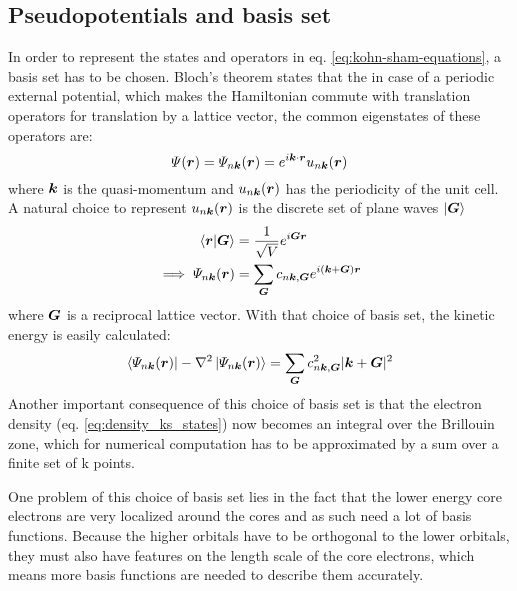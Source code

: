 \documentclass[main.tex]{subfiles}
\begin{document}
\subsection{Pseudopotentials and basis set}\label{sub:theory_basis_set}

In order to represent the states and operators in eq. \ref{eq:kohn-sham-equations}, a basis set has to be chosen.
Bloch's theorem states that the in case of a periodic external potential, which makes the Hamiltonian commute with translation operators for translation by a lattice vector, the common eigenstates of these operators are:
\begin{equation}
    \Psi (\vb*{r}) = \Psi_{n \vb*{k}} (\vb*{r}) = e^{i \vb*{k} \cdot \vb*{r}} u_{n \vb*{k}} (\vb*{r})
\end{equation}
where \(\vb*{k}\) is the quasi-momentum and \(u_{n \vb*{k}} (\vb*{r})\) has the periodicity of the unit cell.
A natural choice to represent \(u_{n \vb*{k}} (\vb*{r})\) is the discrete set of plane waves \(\ket{\vb*{G}}\)
\begin{align}
    \bra{\vb*{r}} \ket{\vb*{G}} &= \frac{1}{\sqrt{V}} e^{i \vb*{G} \vb*{r}} \\
    \implies \Psi_{n \vb*{k}} (\vb*{r}) &= \sum_{\vb*{G}} c_{n \vb*{k}, \vb*{G}} e^{i (\vb*{k} + \vb*{G}) \vb*{r}}
\end{align}
where \(\vb*{G}\) is a reciprocal lattice vector. 
With that choice of basis set, the kinetic energy is easily calculated:
\begin{equation}
    \bra{\Psi_{n \vb*{k}} (\vb*{r})} - \nabla^2 \ket{\Psi_{n \vb*{k}} (\vb*{r})} = \sum_{\vb*{G}} c_{n \vb*{k}, \vb*{G}}^2 \vert \vb*{k} + \vb*{G} \vert^2
\end{equation}
Another important consequence of this choice of basis set is that the electron density (eq. \ref{eq:density_ks_states}) now becomes an integral over the Brillouin zone, which for numerical computation has to be approximated by a sum over a finite set of k points. 

One problem of this choice of basis set lies in the fact that the lower energy core electrons are very localized around the cores and as such need a lot of basis functions.
Because the higher orbitals have to be orthogonal to the lower orbitals, they must also have features on the length scale of the core electrons, which means more basis functions are needed to describe them accurately.
\end{document}
